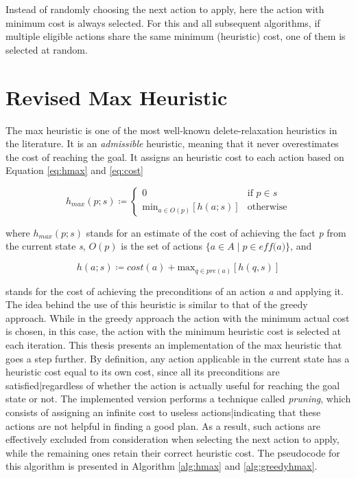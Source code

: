 Instead of randomly choosing the next action to apply, here the action with minimum cost is always selected.
For this and all subsequent algorithms, if multiple eligible actions share the same minimum (heuristic) cost,
one of them is selected at random.

\section{Revised Max Heuristic}
\label{sec:hmax}
The max heuristic is one of the most well-known delete-relaxation heuristics in the literature.
It is an \textit{admissible} heuristic, meaning that it never overestimates the cost of reaching the goal.
It assigns an heuristic cost to each action based on Equation \ref{eq:hmax} and \ref{eq:cost}

\begin{equation}
	\label{eq:hmax}
	h_{max}\left(p;s\right) \coloneqq \begin{cases}
		0                                                                & \text{if $p \in s$} \\
		\text{min}_{a \in O\left(p\right)}\left[h\left(a;s\right)\right] & \text{otherwise}
	\end{cases}
\end{equation}

where $h_{max}\left(p;s\right)$ stands for an estimate of the cost of achieving the fact \textit{p} from
the current state \textit{s}, $O\left(p\right)$ is the set of actions $\{a \in A \mid p \in \textit{eff(a)}\}$, and

\begin{equation}
	\label{eq:cost}
	h\left(a;s\right) \coloneqq cost(a) + \text{max}_{q \in pre\left(a\right)} \left[h(q, s)\right]
\end{equation}

stands for the cost of achieving the preconditions of an action \textit{a} and applying it.\\
The idea behind the use of this heuristic is similar to that of the greedy approach.
While in the greedy approach the action with the minimum actual cost is chosen, in this case,
the action with the minimum heuristic cost is selected at each iteration.
This thesis presents an implementation of the max heuristic that goes a step further.
By definition, any action applicable in the current state has a heuristic cost equal to
its own cost, since all its preconditions are satisfied|regardless of whether the action is
actually useful for reaching the goal state or not.
The implemented version performs a technique called \textit{pruning}, which consists of assigning
an infinite cost to useless actions|indicating that these actions are not helpful in finding a good plan.
As a result, such actions are effectively excluded from consideration when selecting the next action to apply,
while the remaining ones retain their correct heuristic cost.
The pseudocode for this algorithm is presented in Algorithm \ref{alg:hmax} and \ref{alg:greedyhmax}.

